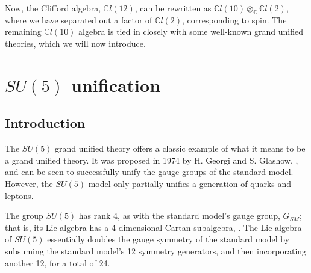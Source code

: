 \documentclass[letterpaper,12pt,titlepage,oneside,final]{book}
\newcommand{\C}{\mathbb{C}}
\newcommand{\CLtwo}{\mathbb{C}l(2)}
\newcommand{\CLtwelve}{\mathbb{C}l(12)}
\newcommand{\CLten}{\mathbb{C}l(10)}
\begin{document}

Now, the Clifford algebra, $\CLtwelve$, can be rewritten as $\CLten\otimes_{\C} \CLtwo$, where we have separated out a factor of $\CLtwo$, corresponding to spin.  The remaining $\CLten$ algebra is tied in closely with some well-known grand unified theories, which we will now introduce.


  


\section{$SU(5)$ unification  }




\subsection{Introduction  }

The $SU(5)$ grand unified theory offers a classic example of what it means to be a grand unified theory.  It was proposed in 1974 by H. Georgi and S. Glashow, \cite{su5}, and can be seen to successfully unify the gauge groups of the standard model.  However, the $SU(5)$ model only partially unifies a generation of quarks and leptons.  

The group $SU(5)$ has rank 4, as with the standard model's gauge group, $G_{SM}$; that is, its Lie algebra has a 4-dimensional Cartan subalgebra, \cite{Lang}.  The Lie algebra of $SU(5)$ essentially doubles the gauge symmetry of the standard model by subsuming the standard model's 12 symmetry generators, and then incorporating another 12, for a total of 24. 
\end{document}
